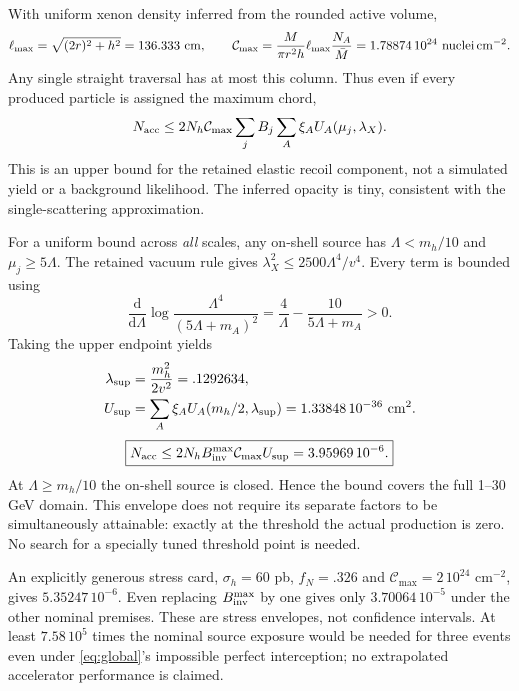 \documentclass[11pt,a4paper]{article}
\newcommand{\dd}{\mathrm d}
\begin{document}
With uniform xenon density inferred from the rounded active volume,
\begin{equation}
 \ell_{\max}=\sqrt{(2r)^2+h^2}=136.333\ {\rm cm},\qquad
 \mathcal C_{\max}=\frac{M}{\pi r^2h}\ell_{\max}
                  \frac{N_A}{\bar M}
 =1.78874\,10^{24}\ {\rm nuclei\,cm^{-2}}.
\end{equation}
Any single straight traversal has at most this column. Thus even if
every produced particle is assigned the maximum chord,
\begin{equation}\label{eq:bound}
 N_{\rm acc}\leq
 2N_h\mathcal C_{\max}\sum_jB_j\sum_A\xi_A U_A(\mu_j,\lambda_X).
\end{equation}
This is an upper bound for the retained elastic recoil component,
not a simulated yield or a background likelihood. The inferred opacity
is tiny, consistent with the single-scattering approximation.

For a uniform bound across \emph{all} scales, any on-shell source has
$\Lambda<m_h/10$ and $\mu_j\geq5\Lambda$. The retained vacuum rule gives
$\lambda_X^2\leq2500\Lambda^4/v^4$. Every term is bounded using
\begin{equation}
 \frac{\dd}{\dd\Lambda}
 \log\frac{\Lambda^4}{(5\Lambda+m_A)^2}
 =\frac4\Lambda-\frac{10}{5\Lambda+m_A}>0.
\end{equation}
Taking the upper endpoint yields
\begin{align}
 \lambda_{\rm sup}&=\frac{m_h^2}{2v^2}=.1292634,\\
 U_{\rm sup}&=\sum_A\xi_A U_A(m_h/2,\lambda_{\rm sup})
             =1.33848\,10^{-36}\ {\rm cm}^2 .
\end{align}
\begin{equation}
 \boxed{N_{\rm acc}\leq2N_h B_{\rm inv}^{\max}
       \mathcal C_{\max}U_{\rm sup}=3.95969\,10^{-6}.}
 \label{eq:global}
\end{equation}
At $\Lambda\geq m_h/10$ the on-shell source is closed. Hence the bound
covers the full 1--30 GeV domain. This envelope does not require its
separate factors to be simultaneously attainable: exactly at the
threshold the actual production is zero. No search for a specially
tuned threshold point is needed.

An explicitly generous stress card, $\sigma_h=60$ pb, $f_N=.326$ and
$\mathcal C_{\max}=2\,10^{24}$ cm$^{-2}$, gives $5.35247\,10^{-6}$.
Even replacing $B_{\rm inv}^{\max}$ by one gives only
$3.70064\,10^{-5}$ under the other nominal premises. These are stress
envelopes, not confidence intervals. At least $7.58\,10^5$ times the
nominal source exposure would be needed for three events even under
\eqref{eq:global}'s impossible perfect interception; no extrapolated
accelerator performance is claimed.
\end{document}
